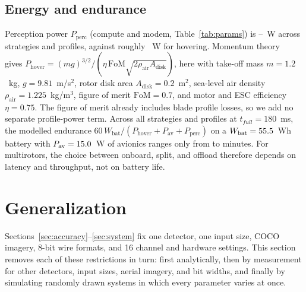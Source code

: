 \documentclass[journal,twocolumn,10pt]{IEEEtran}
\begin{document}
\subsection{Energy and endurance}
Perception power $P_{\mathrm{perc}}$ (compute and modem, Table~\ref{tab:params}) is \PerceptionPowerMinW--\PerceptionPowerMaxW~W across strategies and profiles, against roughly \HoverW~W for hovering. Momentum theory~\cite{leishman2006principles} gives $P_{\mathrm{hover}}=(mg)^{3/2}/(\eta\,\mathrm{FoM}\sqrt{2\rho_{\mathrm{air}}A_{\mathrm{disk}}})$, here with take-off mass $m=1.2$~kg, $g=9.81$~m/s$^2$, rotor disk area $A_{\mathrm{disk}}=0.2$~m$^2$, sea-level air density $\rho_{\mathrm{air}}=1.225$~kg/m$^3$, figure of merit $\mathrm{FoM}=0.7$, and motor and ESC efficiency $\eta=0.75$. The figure of merit already includes blade profile losses, so we add no separate profile-power term. Across all strategies and profiles at $t_{full}=180$~ms, the modelled endurance $60\,W_{\mathrm{bat}}/(P_{\mathrm{hover}}+P_{\mathrm{av}}+P_{\mathrm{perc}})$ on a $W_{\mathrm{bat}}=55.5$~Wh battery with $P_{\mathrm{av}}=15.0$~W of avionics ranges only from \EnduranceMin{} to \EnduranceMax{} minutes. For multirotors, the choice between onboard, split, and offload therefore depends on latency and throughput, not on battery life.

\begin{table}[t]
\centering
\caption{System-model parameters. Assumed values are not measurements; results are reported across the onboard-speed sweep.}
\label{tab:params}
{\footnotesize}
\end{table}

\section{Generalization}\label{sec:generalization}
Sections~\ref{sec:accuracy}--\ref{sec:system} fix one detector, one input size, COCO imagery, 8-bit wire formats, and 16 channel and hardware settings. This section removes each of these restrictions in turn: first analytically, then by measurement for other detectors, input sizes, aerial imagery, and bit widths, and finally by simulating randomly drawn systems in which every parameter varies at once.
\end{document}
